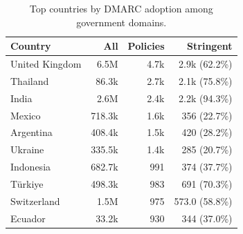 \begin{table}[tb]
\centering
\scriptsize
\caption{Top countries by DMARC adoption among government domains.}
\label{tab:gov_dmarc_country}
\begin{tabular}{lrrr}
\toprule
\textbf{Country} & \textbf{All} & \textbf{Policies} & \textbf{Stringent}\\
\midrule
United Kingdom & 6.5M & 4.7k & 2.9k (62.2\%) \\
Thailand & 86.3k & 2.7k & 2.1k (75.8\%) \\
India & 2.6M & 2.4k & 2.2k (94.3\%) \\
Mexico & 718.3k & 1.6k & 356 (22.7\%) \\
Argentina & 408.4k & 1.5k & 420 (28.2\%) \\
Ukraine & 335.5k & 1.4k & 285 (20.7\%) \\
Indonesia & 682.7k & 991 & 374 (37.7\%) \\
Türkiye & 498.3k & 983 & 691 (70.3\%) \\
Switzerland & 1.5M & 975 & 573.0 (58.8\%) \\
Ecuador & 33.2k & 930 & 344 (37.0\%) \\
\bottomrule
\end{tabular}
\vspace{-15px}
\end{table}
